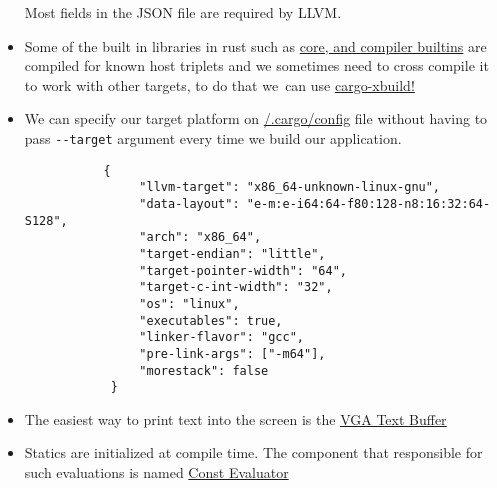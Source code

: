 \documentclass{article}
\begin{document}
\begin{itemize}
    Most fields in the JSON file are required by LLVM.
    \item Some of the built in libraries in rust such as \hyperlink{ref:core-builtins}{core, and compiler builtins} are compiled for known host triplets and we sometimes need to cross compile it to work with other targets, to do that we\
    can use \hyperlink{ref:cargo-xbuild}{cargo-xbuild!}
    \item We can specify our target platform on \hyperlink{ref:cargo-config}{/.cargo/config} file without having to pass \verb|--target| argument every time we build our application.
    \begin{listing}[h]
        \begin{verbatim}
           {
                "llvm-target": "x86_64-unknown-linux-gnu",
                "data-layout": "e-m:e-i64:64-f80:128-n8:16:32:64-S128",
                "arch": "x86_64",
                "target-endian": "little",
                "target-pointer-width": "64",
                "target-c-int-width": "32",
                "os": "linux",
                "executables": true,
                "linker-flavor": "gcc",
                "pre-link-args": ["-m64"],
                "morestack": false
            } 
        \end{verbatim}
    \end{listing} 
    \item The easiest way to print text into the screen is the \hyperlink{ref:vga}{VGA Text Buffer}
    \item Statics are initialized at compile time. The component that responsible for such evaluations is named \hyperlink{ref:const-evaluator}{Const Evaluator}
 \end{itemize}
\end{document}
